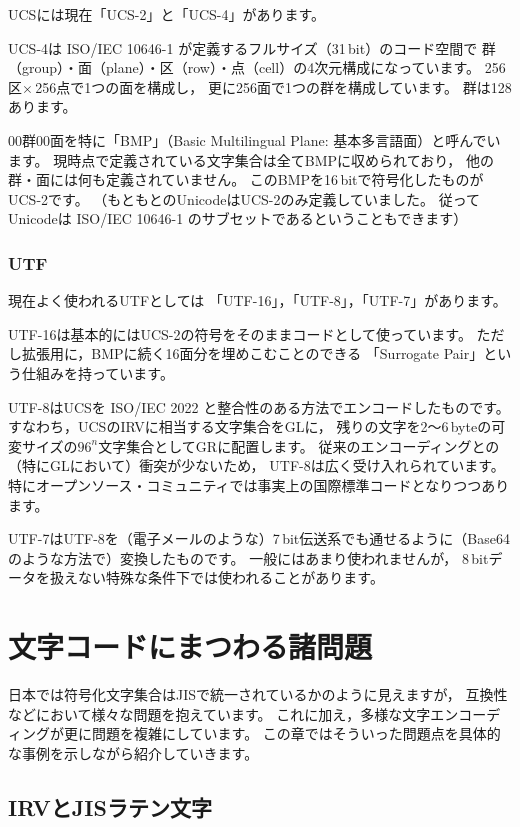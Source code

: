 \documentclass[a4j,10pt,fleqn]{jsarticle}
\begin{document}
UCSには現在「UCS-2」と「UCS-4」があります。

UCS-4は ISO/IEC 10646-1 が定義するフルサイズ（31\,bit）のコード空間で
群（group）・面（plane）・区（row）・点（cell）の4次元構成になっています。
256区$\times$\,256点で1つの面を構成し，
更に256面で1つの群を構成しています。
群は128あります。

00群00面を特に「BMP」（Basic Multilingual Plane: 基本多言語面）と呼んでいます。
現時点で定義されている文字集合は全てBMPに収められており，
他の群・面には何も定義されていません。
このBMPを16\,bitで符号化したものがUCS-2です。
（もともとのUnicodeはUCS-2のみ定義していました。
従ってUnicodeは ISO/IEC 10646-1 のサブセットであるということもできます）

\subsubsection{UTF}

現在よく使われるUTFとしては
「UTF-16」，「UTF-8」，「UTF-7」があります。

UTF-16は基本的にはUCS-2の符号をそのままコードとして使っています。
ただし拡張用に，BMPに続く16面分を埋めこむことのできる
「Surrogate Pair」という仕組みを持っています。

UTF-8はUCSを ISO/IEC 2022 と整合性のある方法でエンコードしたものです。
すなわち，UCSのIRVに相当する文字集合をGLに，
残りの文字を2～6\,byteの可変サイズの$96^n$文字集合としてGRに配置します。
従来のエンコーディングとの（特にGLにおいて）衝突が少ないため，
UTF-8は広く受け入れられています。
特にオープンソース・コミュニティでは事実上の国際標準コードとなりつつあります。

UTF-7はUTF-8を（電子メールのような）7\,bit伝送系でも通せるように（Base64のような方法で）変換したものです。
一般にはあまり使われませんが，
8\,bitデータを扱えない特殊な条件下では使われることがあります。


\section{文字コードにまつわる諸問題}

日本では符号化文字集合はJISで統一されているかのように見えますが，
互換性などにおいて様々な問題を抱えています。
これに加え，多様な文字エンコーディングが更に問題を複雑にしています。
この章ではそういった問題点を具体的な事例を示しながら紹介していきます。


\subsection{IRVとJISラテン文字}
\end{document}
